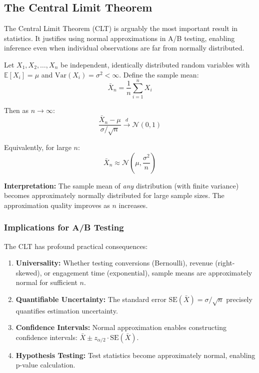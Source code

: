 \subsection{The Central Limit Theorem}

The Central Limit Theorem (CLT) is arguably the most important result in statistics. It justifies using normal approximations in A/B testing, enabling inference even when individual observations are far from normally distributed.

\begin{theorem}
\label{thm:clt}
Let $X_1, X_2, \ldots, X_n$ be independent, identically distributed random variables with $\mathbb{E}[X_i] = \mu$ and $\text{Var}(X_i) = \sigma^2 < \infty$. Define the sample mean:
\begin{equation}
\bar{X}_n = \frac{1}{n}\sum_{i=1}^n X_i
\end{equation}

Then as $n \rightarrow \infty$:
\begin{equation}
\frac{\bar{X}_n - \mu}{\sigma/\sqrt{n}} \xrightarrow{d} \mathcal{N}(0, 1)
\end{equation}

Equivalently, for large $n$:
\begin{equation}
\bar{X}_n \approx \mathcal{N}\left(\mu, \frac{\sigma^2}{n}\right)
\end{equation}
\end{theorem}

\textbf{Interpretation:} The sample mean of \textit{any} distribution (with finite variance) becomes approximately normally distributed for large sample sizes. The approximation quality improves as $n$ increases.

\subsubsection{Implications for A/B Testing}

The CLT has profound practical consequences:

\begin{enumerate}
    \item \textbf{Universality:} Whether testing conversions (Bernoulli), revenue (right-skewed), or engagement time (exponential), sample means are approximately normal for sufficient $n$.

    \item \textbf{Quantifiable Uncertainty:} The standard error $\text{SE}(\bar{X}) = \sigma/\sqrt{n}$ precisely quantifies estimation uncertainty.

    \item \textbf{Confidence Intervals:} Normal approximation enables constructing confidence intervals: $\bar{X} \pm z_{\alpha/2} \cdot \text{SE}(\bar{X})$.

    \item \textbf{Hypothesis Testing:} Test statistics become approximately normal, enabling p-value calculation.
\end{enumerate}

